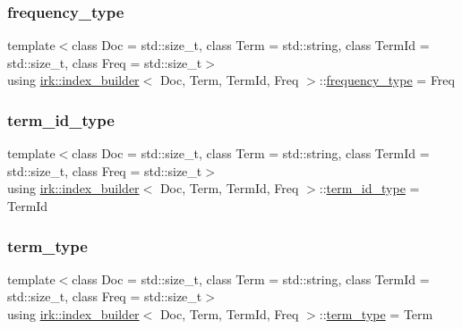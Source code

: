 \mbox{\label{classirk_1_1index__builder_af2efa68fc3f10fd9cb000d16279bfbb1}} 
\subsubsection{\texorpdfstring{frequency\+\_\+type}{frequency\_type}}
{\footnotesize\ttfamily template$<$class Doc  = std\+::size\+\_\+t, class Term  = std\+::string, class Term\+Id  = std\+::size\+\_\+t, class Freq  = std\+::size\+\_\+t$>$ \\
using \mbox{\hyperlink{classirk_1_1index__builder}{irk\+::index\+\_\+builder}}$<$ Doc, Term, Term\+Id, Freq $>$\+::\mbox{\hyperlink{classirk_1_1index__builder_af2efa68fc3f10fd9cb000d16279bfbb1}{frequency\+\_\+type}} =  Freq}

\mbox{\label{classirk_1_1index__builder_a6736f4a9aa142d3ca15c5e8c3b0a352f}} 
\subsubsection{\texorpdfstring{term\+\_\+id\+\_\+type}{term\_id\_type}}
{\footnotesize\ttfamily template$<$class Doc  = std\+::size\+\_\+t, class Term  = std\+::string, class Term\+Id  = std\+::size\+\_\+t, class Freq  = std\+::size\+\_\+t$>$ \\
using \mbox{\hyperlink{classirk_1_1index__builder}{irk\+::index\+\_\+builder}}$<$ Doc, Term, Term\+Id, Freq $>$\+::\mbox{\hyperlink{classirk_1_1index__builder_a6736f4a9aa142d3ca15c5e8c3b0a352f}{term\+\_\+id\+\_\+type}} =  Term\+Id}

\mbox{\label{classirk_1_1index__builder_ad80a8f10f3e72ed3b9a2f181350f3f1f}} 
\subsubsection{\texorpdfstring{term\+\_\+type}{term\_type}}
{\footnotesize\ttfamily template$<$class Doc  = std\+::size\+\_\+t, class Term  = std\+::string, class Term\+Id  = std\+::size\+\_\+t, class Freq  = std\+::size\+\_\+t$>$ \\
using \mbox{\hyperlink{classirk_1_1index__builder}{irk\+::index\+\_\+builder}}$<$ Doc, Term, Term\+Id, Freq $>$\+::\mbox{\hyperlink{classirk_1_1index__builder_ad80a8f10f3e72ed3b9a2f181350f3f1f}{term\+\_\+type}} =  Term}



